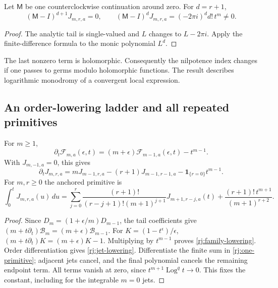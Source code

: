 \begin{corollary}\label{rj:monodromy}
Let $\mathsf M$ be one counterclockwise continuation around zero.
For $d=r+1$,
\[
 (\mathsf M-I)^{d+1}J_{m,r,a}=0,\qquad
 (\mathsf M-I)^dJ_{m,r,a}=(-2\pi i)^d d!\,t^m\ne0 .
\]
\end{corollary}
\begin{proof}
The analytic tail is single-valued and $L$ changes to $L-2\pi i$.
Apply the finite-difference formula to the monic polynomial $L^d$.
\end{proof}
The last nonzero term is holomorphic. Consequently the nilpotence index
changes if one passes to germs modulo holomorphic functions. The result
describes logarithmic monodromy of a convergent local expression.

\subsection{An order-lowering ladder and all repeated primitives}
\begin{theorem}\label{rj:lowering}
For $m\ge1$,
\begin{equation}\label{rj:family-lowering}
 \partial_t\mathcal F_{m,a}(\epsilon,t)
       =(m+\epsilon)\mathcal F_{m-1,a}(\epsilon,t)-t^{m-1}.
\end{equation}
With $J_{m,-1,a}=0$, this gives
\begin{equation}\label{rj:jet-lowering}
 \partial_tJ_{m,r,a}
       =mJ_{m-1,r,a}-(r+1)J_{m-1,r-1,a}
                     -\mathbf1_{\{r=0\}}t^{m-1}.
\end{equation}
For $m,r\ge0$ the anchored primitive is
\begin{equation}\label{rj:one-primitive}
 \int_0^tJ_{m,r,a}(u)\,du
 =\sum_{j=0}^r\frac{(r+1)!}{(r-j+1)!(m+1)^{j+1}}
                       J_{m+1,r-j,a}(t)
  +\frac{(r+1)!\,t^{m+1}}{(m+1)^{r+2}}.
\end{equation}
\end{theorem}
\begin{proof}
Since $D_m=(1+\epsilon/m)D_{m-1}$, the tail coefficients give
$(m+t\partial_t)\mathcal B_m=(m+\epsilon)\mathcal B_{m-1}$.
For $K=(1-t^\epsilon)/\epsilon$,
$(m+t\partial_t)K=(m+\epsilon)K-1$.
Multiplying by $t^{m-1}$ proves \eqref{rj:family-lowering}.
Order differentiation gives \eqref{rj:jet-lowering}.
Differentiate the finite sum in \eqref{rj:one-primitive}; adjacent
jets cancel, and the final polynomial cancels the remaining endpoint
term. All terms vanish at zero, since $t^{m+1}\operatorname{Log}^q t\to0$.
This fixes the constant, including for the integrable $m=0$ jets.
\end{proof}


